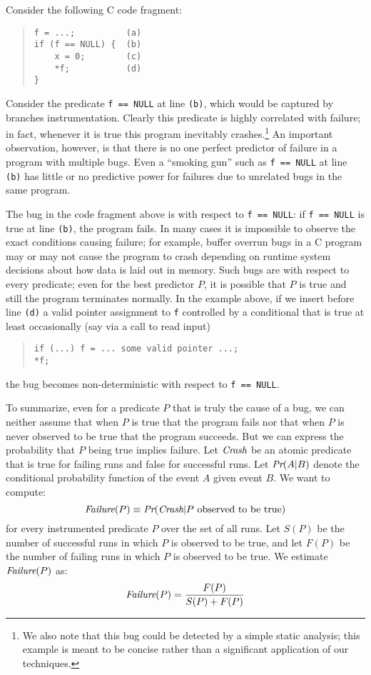 Consider the following C code fragment:
\begin{quote}
\begin{verbatim}
f = ...;          (a)
if (f == NULL) {  (b)
    x = 0;        (c)
    *f;           (d)
}
\end{verbatim}
\end{quote}
Consider the predicate \texttt{f == NULL} at line \texttt{(b)}, which would
be captured by branches instrumentation.  Clearly
this predicate is highly correlated with failure; in fact, whenever it
is true this program inevitably crashes.\footnote{We also note that this bug could
be detected by a simple static analysis; this example is meant to be concise rather than
a significant application of our techniques.}   An important observation,
however, is that there is no one perfect predictor of failure in a
program with multiple bugs.  Even a ``smoking gun'' such as \texttt{f ==
  NULL} at line \texttt{(b)} has little or no predictive power for
failures due to unrelated bugs in the same program.

The bug in the code fragment above is  with
respect to \texttt{f == NULL}: if \texttt{f == NULL} is true at line
\texttt{(b)}, the program fails.  In many cases it is impossible to observe
the exact conditions causing failure; for example, buffer overrun bugs
in a C program may or may not cause the program to crash depending on
runtime system decisions about how data is laid out in memory.  Such
bugs are  with respect to every predicate;
even for the best predictor $P$, it is possible
that $P$ is true and still the program terminates normally.  In the
example above, if we insert before line \texttt{(d)} a valid pointer
assignment to \texttt{f} controlled by a conditional that is true at
least occasionally (say via a call to read input)
\begin{quote}
\begin{verbatim}
if (...) f = ... some valid pointer ...;
*f;
\end{verbatim}
\end{quote}
the bug becomes non-deterministic with respect to \texttt{f == NULL}.

To summarize, even for a predicate $P$ that is truly the cause of a bug, we can neither assume that
when $P$ is true that
the program fails nor that when $P$ is never observed to be true  that
the program succeeds.
But we can express the probability that $P$
being true implies failure.  Let $\textit{Crash}$ be an atomic predicate that is
true for failing runs and false for successful runs.  Let $\textit{Pr}(A | B)$ denote
the conditional probability function of the event $A$ given event $B$.
We want to compute:
\[ \textit{Failure}(P) \equiv \textit{Pr}(\textit{Crash} | \text{$P$ observed to be true}) \]
for every instrumented predicate $P$ over the set of all runs.  Let $S(P)$ be the number
of successful runs in which $P$ is observed to be true, and let $F(P)$ be the number of
failing runs in which $P$ is observed to be true.
We estimate $\textit{Failure}(P)$ as:
\[ \textit{Failure}(P) = \frac{F(P)}{S(P) + F(P)} \]

